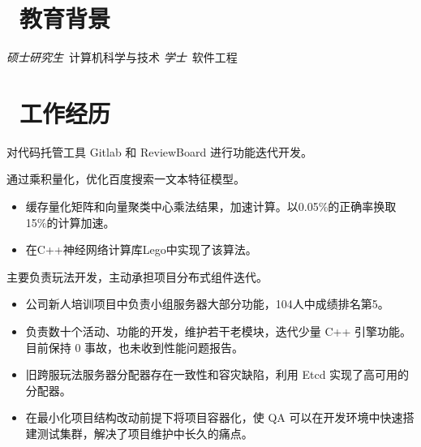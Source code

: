 \documentclass{resume}
\begin{document}


 
\section{\faGraduationCap\ 教育背景}
\textit{硕士研究生}\ 计算机科学与技术
\textit{学士}\ 软件工程

\section{\faUsers\ 工作经历}

对代码托管工具 Gitlab 和 ReviewBoard 进行功能迭代开发。

\role{算法工程师}{百度深研院实习}
通过乘积量化，优化百度搜索一文本特征模型。
\begin{onehalfspacing}
\begin{itemize}
  \item 缓存量化矩阵和向量聚类中心乘法结果，加速计算。以0.05\%的正确率换取15\%的计算加速。
  \item 在C++神经网络计算库Lego中实现了该算法。
\end{itemize}
\end{onehalfspacing}

主要负责玩法开发，主动承担项目分布式组件迭代。
\begin{onehalfspacing}
	\begin{itemize}
		\item 公司新人培训项目中负责小组服务器大部分功能，104人中成绩排名第5。
		\item 负责数十个活动、功能的开发，维护若干老模块，迭代少量 C++ 引擎功能。目前保持 0 事故，也未收到性能问题报告。
		\item 旧跨服玩法服务器分配器存在一致性和容灾缺陷，利用 Etcd 实现了高可用的分配器。
		\item 在最小化项目结构改动前提下将项目容器化，使 QA 可以在开发环境中快速搭建测试集群，解决了项目维护中长久的痛点。
	\end{itemize}
\end{onehalfspacing}
\end{document}
